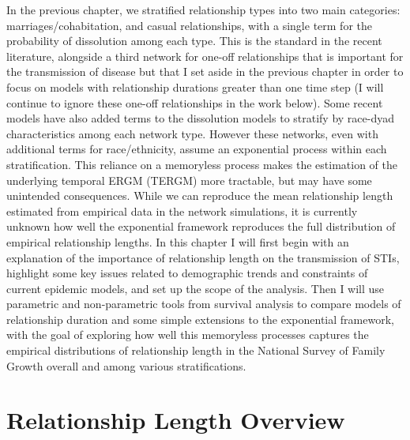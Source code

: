 \documentclass [11pt, proquest] {uwthesis}[2015/03/03]
\begin{document}
In the previous chapter, we stratified relationship types into two main categories: marriages/cohabitation, and casual relationships, with a single term for the probability of dissolution among each type. This is the standard in the recent literature, alongside a third network for one-off relationships that is important for the transmission of disease but that I set aside in the previous chapter in order to focus on models with relationship durations greater than one time step (I will continue to ignore these one-off relationships in the work below). Some recent models have also added terms to the dissolution models to stratify by race-dyad characteristics among each network type. However these networks, even with additional terms for race/ethnicity, assume an exponential process within each stratification. This reliance on a memoryless process makes the estimation of the underlying temporal ERGM (TERGM) more tractable, but may have some unintended consequences. While we can reproduce the mean relationship length estimated from empirical data in the network simulations, it is currently unknown how well the exponential framework reproduces the full distribution of empirical relationship lengths. In this chapter I will first begin with an explanation of the importance of relationship length on the transmission of STIs, highlight some key issues related to demographic trends and constraints of current epidemic models, and set up the scope of the analysis. Then I will use parametric and non-parametric tools from survival analysis to compare models of relationship duration and some simple extensions to the exponential framework, with the goal of exploring how well this memoryless processes captures the empirical distributions of relationship length in the National Survey of Family Growth overall and among various stratifications.

\hypertarget{relationship-length-overview}{%
\section{Relationship Length Overview}\label{relationship-length-overview}}
\end{document}
